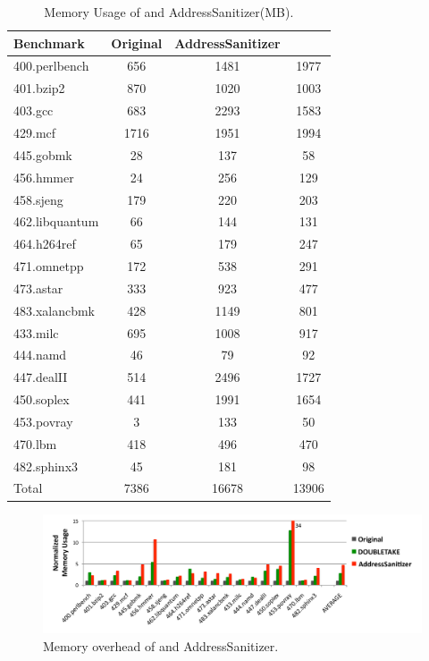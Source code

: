 \begin{table}[t]
\centering
\begin{tabular}{l|c|c|c|}
\textbf{ \small Benchmark} & \textbf{\small Original} &  \textbf{\small AddressSanitizer} & \textbf{\small \doubletake{} } \\
\hline
400.perlbench & 656 &	1481 & 1977 \\
401.bzip2	& 870 &	1020 &	1003 \\
403.gcc	& 683 &	2293 &	1583 \\
429.mcf	& 1716 &	1951 &	1994 \\
445.gobmk &	28 &	137 &	58 \\
456.hmmer &	24 &	256 &	129 \\
458.sjeng & 179 & 220 &	203 \\
462.libquantum	& 66 &	144 &	131 \\
464.h264ref	& 65 &	179 &	247 \\
471.omnetpp	& 172 &	538 &	291 \\
473.astar	& 333 &	923 &	477 \\
483.xalancbmk &	428 & 1149 &	801 \\
433.milc	& 695 &	1008 &	917 \\
444.namd	& 46 &	79 &	92 \\
447.dealII	& 514 &	2496 &	1727 \\
450.soplex	& 441 &	1991 &	1654 \\
453.povray	& 3 &	133 &	50 \\
470.lbm	& 418 &	496 &	470 \\
482.sphinx3 &	45 &	181 & 98 \\
\hline
Total & 7386 & 16678 & 13906 \\
\hline
\end{tabular}
\caption{Memory Usage of \doubletake{} and AddressSanitizer(MB).\label{tbl:memoryoverhead}}
\end{table}


\begin{figure}
\begin{center}
\includegraphics[width=6.5in]{doubletake/figure/memory}
\end{center}
\caption{
Memory overhead of \doubletake{} and AddressSanitizer.
\label{fig:memory}}
\end{figure}

